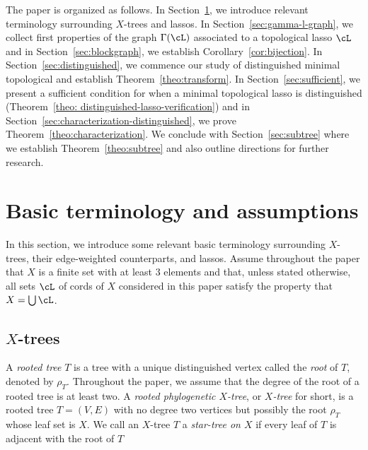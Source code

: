 
The paper is organized as follows. In Section~\ref{sec:terminology}, we
introduce relevant terminology surrounding $X$-trees and lassos. In
Section~\ref{sec:gamma-l-graph}, we collect first properties of the graph
$\Gamma(\cL)$ associated to a topological lasso $\cL$ and in
Section~\ref{sec:blockgraph}, we establish Corollary~\ref{cor:bijection}. In
Section~\ref{sec:distinguished}, we commence our study of distinguished
minimal topological and establish Theorem~\ref{theo:transform}. In
Section~\ref{sec:sufficient}, we present a sufficient condition for when a
minimal topological lasso is distinguished (Theorem~\ref{theo:
  distinguished-lasso-verification}) and in
Section~\ref{sec:characterization-distinguished}, we prove
Theorem~\ref{theo:characterization}. We conclude with
Section~\ref{sec:subtree} where we establish Theorem~\ref{theo:subtree} and
also outline directions for further research.


\section{Basic terminology and assumptions}\label{sec:terminology}
In this section, we introduce some relevant basic terminology surrounding
$X$-trees, their edge-weighted counterparts, and lassos.  Assume throughout
the paper that $X$ is a finite set with at least 3 elements and that, unless
stated otherwise, all sets $\cL$ of cords of $X$ considered in this paper
satisfy the property that
$X=\bigcup \cL$. 


\subsection{$X$-trees}
A {\em rooted tree} $T$ is a tree with a unique distinguished vertex called
the {\em root} of $T$, denoted by $\rho_T$. Throughout the paper, we assume
that the degree of the root of a rooted tree is at least two.  A {\em rooted
  phylogenetic $X$-tree}, or {\em $X$-tree} for short, is a rooted tree
$T=(V,E)$ with no degree two vertices but possibly the root $\rho_T$ whose
leaf set is $X$. We call an $X$-tree $T$ a {\em star-tree on $X$} if every
leaf of $T$ is adjacent with the root of $T$

